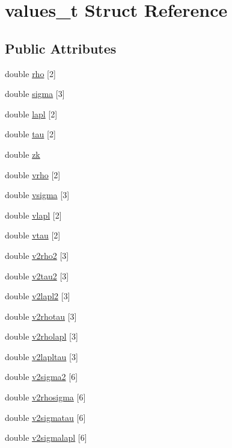 \hypertarget{structvalues__t}{\section{values\-\_\-t Struct Reference}
\label{structvalues__t}
}
\subsection*{Public Attributes}
\begin{DoxyCompactItemize}
\item 
double \hyperlink{structvalues__t_a653ca8dceaf2c047aa741beb1c0133c1}{rho} \mbox{[}2\mbox{]}
\item 
double \hyperlink{structvalues__t_a01a71f7a76c5619239644df2a6667196}{sigma} \mbox{[}3\mbox{]}
\item 
double \hyperlink{structvalues__t_a29ad52e389047ae3f032fe9a01e1939a}{lapl} \mbox{[}2\mbox{]}
\item 
double \hyperlink{structvalues__t_a3c9ead343c372876f2527265817fc557}{tau} \mbox{[}2\mbox{]}
\item 
double \hyperlink{structvalues__t_a94c4faad7a251425af5ad3f10d887e5d}{zk}
\item 
double \hyperlink{structvalues__t_acd12d3bc3e0067cc13517bca2df3f1b0}{vrho} \mbox{[}2\mbox{]}
\item 
double \hyperlink{structvalues__t_aa816cbd72691a994a705f1012b3d0168}{vsigma} \mbox{[}3\mbox{]}
\item 
double \hyperlink{structvalues__t_a357d568bfcc60864047adfc9f774461b}{vlapl} \mbox{[}2\mbox{]}
\item 
double \hyperlink{structvalues__t_ab569f92befb05fae02665bd6bc735617}{vtau} \mbox{[}2\mbox{]}
\item 
double \hyperlink{structvalues__t_a2f600ea672aacda5596809a8f66348a7}{v2rho2} \mbox{[}3\mbox{]}
\item 
double \hyperlink{structvalues__t_a556fe1c2c0c1cc3a25e8e04e26c7e63b}{v2tau2} \mbox{[}3\mbox{]}
\item 
double \hyperlink{structvalues__t_a580e4d8db71e41ed160e67dbb5402a59}{v2lapl2} \mbox{[}3\mbox{]}
\item 
double \hyperlink{structvalues__t_aae1026ec3f753b81555afb901e2e9962}{v2rhotau} \mbox{[}3\mbox{]}
\item 
double \hyperlink{structvalues__t_acfedcb9aee8f88976107b6ca705c39e5}{v2rholapl} \mbox{[}3\mbox{]}
\item 
double \hyperlink{structvalues__t_a5c8fe2d7020d15f82ed203ce2e2ebe46}{v2lapltau} \mbox{[}3\mbox{]}
\item 
double \hyperlink{structvalues__t_acd96820e5704cff5deb4e5100e161d51}{v2sigma2} \mbox{[}6\mbox{]}
\item 
double \hyperlink{structvalues__t_adb87dbaa0658ad86f0cf9a0c9c49bfde}{v2rhosigma} \mbox{[}6\mbox{]}
\item 
double \hyperlink{structvalues__t_a59a76af747acd4d08c69fb34fd917a2d}{v2sigmatau} \mbox{[}6\mbox{]}
\item 
double \hyperlink{structvalues__t_a3b08045c16bb0821619b6b00176b5fe9}{v2sigmalapl} \mbox{[}6\mbox{]}
\end{DoxyCompactItemize}


